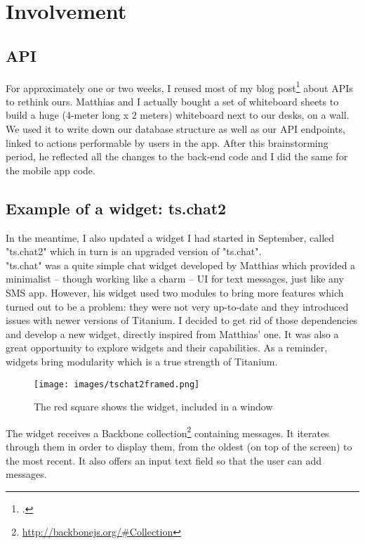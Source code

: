 \section{Involvement}

\subsection{API}

For approximately one or two weeks, I reused most of my blog post\footcite[See the reference][in the bibliography]{api_my_blog} about APIs to rethink ours. Matthias and I actually bought a set of whiteboard sheets to build a huge (4-meter long x 2 meters) whiteboard next to our desks, on a wall. We used it to write down our database structure as well as our API endpoints, linked to actions performable by users in the app. After this brainstorming period, he reflected all the changes to the back-end code and I did the same for the mobile app code.

\subsection{Example of a widget: ts.chat2}

In the meantime, I also updated a widget I had started in September, called "ts.chat2" which in turn is an upgraded version of "ts.chat".\\
"ts.chat" was a quite simple chat widget developed by Matthias which provided a minimalist -- though working like a charm -- UI for text messages, just like any SMS app. However, his widget used two modules to bring more features which turned out to be a problem: they were not very up-to-date and they introduced issues with newer versions of Titanium. I decided to get rid of those dependencies and develop a new widget, directly inspired from Matthias' one. It was also a great opportunity to explore widgets and their capabilities. As a reminder, widgets bring modularity which is a true strength of Titanium.

\begin{figure}[H]
   \centering\texttt{[image: images/tschat2framed.png]}
   \caption[KopenVerkopen -- ts.chat2]{The red square shows the widget, included in a window}\label{tschat2pic}
\end{figure}

The widget receives a Backbone collection\footnote{\href{http://backbonejs.org/\#Collection}{http://backbonejs.org/\#Collection}} containing messages. It iterates through them in order to display them, from the oldest (on top of the screen) to the most recent. It also offers an input text field so that the user can add messages.

